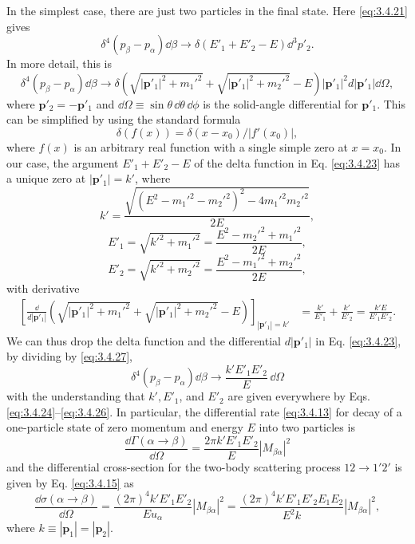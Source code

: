 In the simplest case, there are just two particles in the final state. Here \eqref{eq:3.4.21} gives
\[
 \delta^4(p_\beta-p_\alpha)\dd\beta\longrightarrow
 \delta(E'_1+E'_2-E)\dd^3p'_2.
\]
In more detail, this is
\begin{equation}
 \delta^4(p_\beta-p_\alpha)\dd\beta\longrightarrow
 \delta\left(\sqrt{|\mathbf{p}'_1|^2+m_1'^2}
 +\sqrt{|\mathbf{p}'_1|^2+m_2'^2}-E\right)
 |\mathbf{p}'_1|^2d|\mathbf{p}'_1|\dd\Omega,
 \tag{3.4.23}\label{eq:3.4.23}
\end{equation}
where $\mathbf{p}'_2=-\mathbf{p}'_1$ and $\dd\Omega\equiv\sin\theta\,\dd\theta\,\dd\phi$ is the
solid-angle differential for $\mathbf{p}'_1$. This can be simplified by using the standard formula
\[
 \delta(f(x))=\delta(x-x_0)/|f'(x_0)|,
\]
where $f(x)$ is an arbitrary real function with a single simple zero at $x=x_0$. In our case,
the argument $E'_1+E'_2-E$ of the delta function in Eq. \eqref{eq:3.4.23} has a unique zero at
$|\mathbf{p}'_1|=k'$, where
\begin{equation}
 k'=\frac{\sqrt{(E^2-m_1'^2-m_2'^2)^2-4m_1'^2m_2'^2}}{2E},
 \tag{3.4.24}\label{eq:3.4.24}
\end{equation}
\begin{equation}
 E'_1=\sqrt{k'^2+m_1'^2}=\frac{E^2-m_2'^2+m_1'^2}{2E},
 \tag{3.4.25}\label{eq:3.4.25}
\end{equation}
\begin{equation}
 E'_2=\sqrt{k'^2+m_2'^2}=\frac{E^2-m_1'^2+m_2'^2}{2E},
 \tag{3.4.26}\label{eq:3.4.26}
\end{equation}
with derivative
\begin{align}
 \left[\frac{\dd}{d|\mathbf{p}'_1|}
 \left(\sqrt{|\mathbf{p}'_1|^2+m_1'^2}
 +\sqrt{|\mathbf{p}'_1|^2+m_2'^2}-E\right)\right]_{|\mathbf{p}'_1|=k'}
 &=\frac{k'}{E'_1}+\frac{k'}{E'_2}=\frac{k'E}{E'_1E'_2}.
 \tag{3.4.27}\label{eq:3.4.27}
\end{align}
We can thus drop the delta function and the differential $d|\mathbf{p}'_1|$ in Eq. \eqref{eq:3.4.23},
by dividing by \eqref{eq:3.4.27},
\begin{equation}
 \delta^4(p_\beta-p_\alpha)\dd\beta\longrightarrow
 \frac{k'E'_1E'_2}{E}\,\dd\Omega
 \tag{3.4.28}\label{eq:3.4.28}
\end{equation}
with the understanding that $k',E'_1$, and $E'_2$ are given everywhere by Eqs. \eqref{eq:3.4.24}--\eqref{eq:3.4.26}.
In particular, the differential rate \eqref{eq:3.4.13} for decay of a one-particle state of zero momentum
and energy $E$ into two particles is
\begin{equation}
 \frac{\dd\Gamma(\alpha\to\beta)}{\dd\Omega}
 =\frac{2\pi k'E'_1E'_2}{E}|M_{\beta\alpha}|^2
 \tag{3.4.29}\label{eq:3.4.29}
\end{equation}
and the differential cross-section for the two-body scattering process $12\to1'2'$ is given by
Eq. \eqref{eq:3.4.15} as
\begin{equation}
 \frac{\dd\sigma(\alpha\to\beta)}{\dd\Omega}
 =\frac{(2\pi)^4k'E'_1E'_2}{Eu_\alpha}|M_{\beta\alpha}|^2
 =\frac{(2\pi)^4k'E'_1E'_2E_1E_2}{E^2k}|M_{\beta\alpha}|^2,
 \tag{3.4.30}\label{eq:3.4.30}
\end{equation}
where $k\equiv|\mathbf{p}_1|=|\mathbf{p}_2|$.

